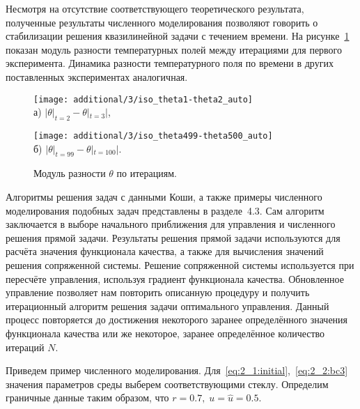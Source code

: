 Несмотря на отсутствие соответствующего теоретического результата,
полученные результаты численного моделирования
позволяют говорить о стабилизации решения квазилинейной задачи с течением времени.
На рисунке~\ref{fig:4_3:time_diff} показан модуль разности температурных полей
между итерациями для первого эксперимента.
Динамика разности температурного поля по времени в других поставленных экспериментах аналогичная.
\begin{figure}[h!t]
    \begin{minipage}[b][][b]{0.49\linewidth}
        \centering
        \texttt{[image: additional/3/iso\_theta1-theta2\_auto]} \\ а) $|\theta|_{t=2} - \theta|_{t=3}|$,
    \end{minipage}
    \hfill
    \begin{minipage}[b][][b]{0.49\linewidth}
        \centering
        \texttt{[image: additional/3/iso\_theta499-theta500\_auto]} \\ б) $|\theta|_{t=99} - \theta|_{t=100}|$.
    \end{minipage}
    \caption{Модуль разности $\theta$ по итерациям.}
    \label{fig:4_3:time_diff}
\end{figure}


Алгоритмы решения задач с данными Коши, а также примеры численного
моделирования подобных задач представлены в разделе~4.3.
Сам алгоритм заключается в выборе начального приближения
для управления и численного решения прямой задачи.
Результаты решения прямой задачи используются для расчёта значения функционала качества,
а также для вычисления значений решения сопряженной системы.
Решение сопряженной системы используется при пересчёте управления,
используя градиент функционала качества.
Обновленное управление позволяет нам повторить описанную процедуру и получить итерационный
алгоритм решения задачи оптимального управления.
Данный процесс повторяется до достижения некоторого заранее определённого значения функционала
качества или же некоторое, заранее определённое количество итераций $N$.


Приведем пример численного моделирования.
Для~\eqref{eq:2_1:initial},~\eqref{eq:2_2:bc3} значения параметров
среды выберем соответствующими стеклу.
Определим граничные данные таким образом, что $r = 0.7,\; u = \hat u = 0.5$.

